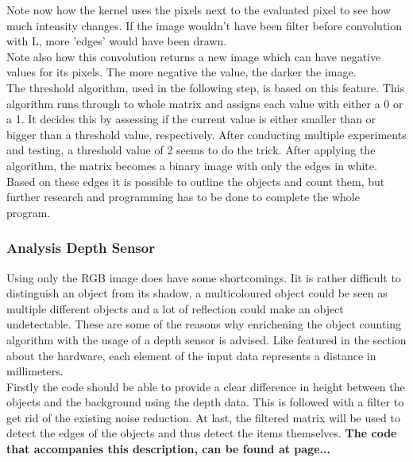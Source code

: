 \documentclass[11pt]{article}
\begin{document}
Note now how the kernel uses the pixels next to the evaluated pixel to see how much intensity changes. If the image wouldn't have been filter before convolution with L, more 'edges' would have been drawn.\\
Note also how this convolution returns a new image which can have negative values for its pixels. The more negative the value, the darker the image.\\
The threshold algorithm, used in the following step, is based on this feature. This algorithm runs through to whole matrix and assigns each value with either a 0 or a 1. It decides this by assessing if the current value is either smaller than or bigger than a threshold value, respectively. After conducting multiple experiments and testing, a threshold value of 2 seems to do the trick. After applying the algorithm, the matrix becomes a binary image with only the edges in white. Based on these edges it is possible to outline the objects and count them, but further research and programming has to be done to complete the whole program.

\subsubsection{Analysis Depth Sensor}
Using only the RGB image does have some shortcomings. Iit is rather difficult to distinguish an object from its shadow, a multicoloured object could be seen as multiple different objects and a lot of reflection could make an object undetectable. These are some of the reasons why enrichening the object counting algorithm with the usage of a depth sensor is advised. Like featured in the section about the hardware, each element of the input data represents a distance in millimeters.\\
Firstly the code should be able to provide a clear difference in height between the objects and the background using the depth data. This is followed with a filter to get rid of the existing noise reduction. At last, the filtered matrix will be used to detect the edges of the objects and thus detect the items themselves. \textbf{The code that accompanies this description, can be found at page...}
 
\end{document}
